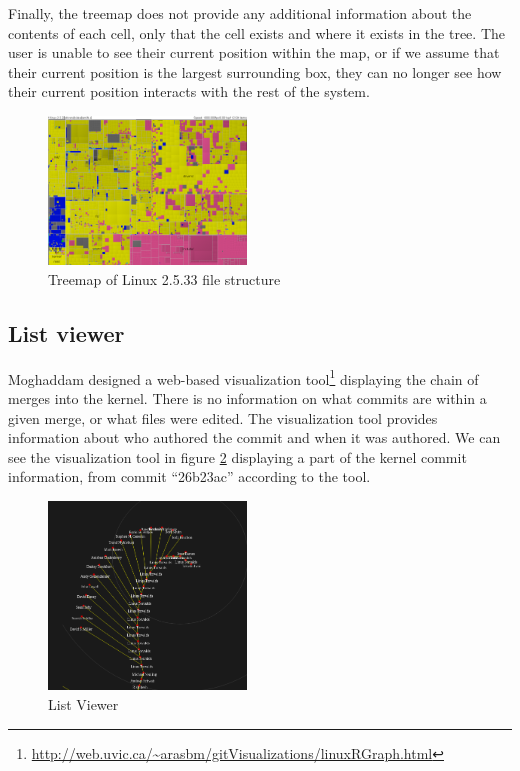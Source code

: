 \documentclass[conference, draftclsnofoot]{IEEEtran}
\begin{document}
Finally, the treemap does not provide any additional information about the
contents of each cell, only that the cell exists and where it exists in the
tree. The user is unable to see their current position within the map, or if we
assume that their current position is the largest surrounding box, they can
no longer see how their current position interacts with the rest of the
system.

\begin{figure}[h]
        \centering
        \includegraphics[width=0.47\textwidth]{figures/kernel-files.png}
        \caption{Treemap of Linux 2.5.33 file structure}
        \label{fig:treemap}
\end{figure}

\subsection{List viewer}
Moghaddam designed a web-based visualization
tool\footnote{\url{http://web.uvic.ca/~arasbm/gitVisualizations/linuxRGraph.html}}
displaying the chain of merges into the kernel. There is no information on what
commits are within a given merge, or what files were edited. The visualization
tool provides information about who authored the commit and when it was
authored. We can see the visualization tool in figure \ref{fig:listviewer}
displaying a part of the kernel commit information, from commit ``26b23ac''
according to the tool.


\begin{figure}[h]
        \centering
        \includegraphics[width=0.47\textwidth]{figures/gitvis.png}
        \caption{List Viewer}
        \label{fig:listviewer}
\end{figure}
\end{document}
